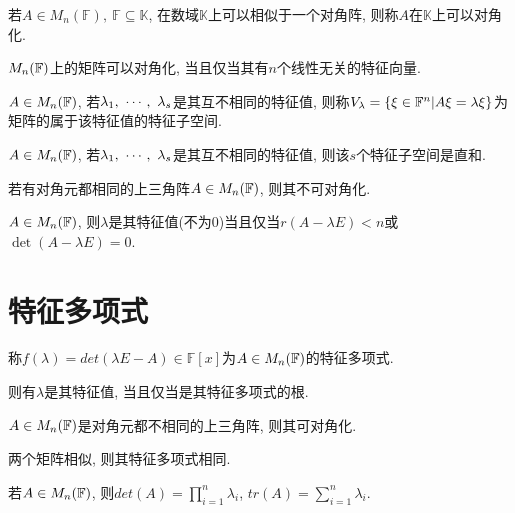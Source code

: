 \begin{definition}[可对角化]
    若$A\in M_n(\mathbb{F}), \ \mathbb{F}\subseteq \mathbb{K}$, 在数域$\mathbb{K}$上可以相似于一个对角阵, 则称$A$在$\mathbb{K}$上可以对角化.
\end{definition}

\begin{inference}
    $M_{n}(\mathbb{F})$上的矩阵可以对角化, 当且仅当其有$n$个线性无关的特征向量.
\end{inference}

\begin{definition}[特征子空间]
    $A\in M_{n}(\mathbb{F})$, 若${\lambda}{_1},\ \cdots,\ {\lambda}{_{s}}$是其互不相同的特征值, 则称$V_{\lambda}=\{\xi\in \mathbb{F}^n|A\xi=\lambda \xi\}$为矩阵的属于该特征值的特征子空间.
\end{definition}

\begin{lemma}
    $A\in M_{n}(\mathbb{F})$, 若${\lambda}{_1},\ \cdots,\ {\lambda}{_{s}}$是其互不相同的特征值, 则该$s$个特征子空间是直和.
\end{lemma}

\begin{inference}
    若有对角元都相同的上三角阵$A\in M_{n}(\mathbb{F})$, 则其不可对角化.
\end{inference}

\begin{lemma}
    $A\in M_{n}(\mathbb{F})$, 则$\lambda$是其特征值(不为0)当且仅当$r(A-\lambda E)<n$或$\det(A-\lambda E)=0$.
\end{lemma}

\section{ 特征多项式 }

\begin{definition}[特征多项式]
    称$f(\lambda)=det(\lambda E-A)\in \mathbb{F}[x]$为$A\in M_{n}(\mathbb{F})$的特征多项式.\par
    则有$\lambda$是其特征值, 当且仅当是其特征多项式的根.
\end{definition}

\begin{inference}
    $A\in M_{n}(\mathbb{F})$是对角元都不相同的上三角阵, 则其可对角化.
\end{inference}

\begin{inference}
    两个矩阵相似, 则其特征多项式相同.
\end{inference}

\begin{inference}
    若$A\in M_{n}(\mathbb{F})$, 则$det(A)=\prod_{i=1}^n\lambda{_i}$, $tr(A)=\sum_{i=1}^n\lambda{_i}$.
\end{inference}

